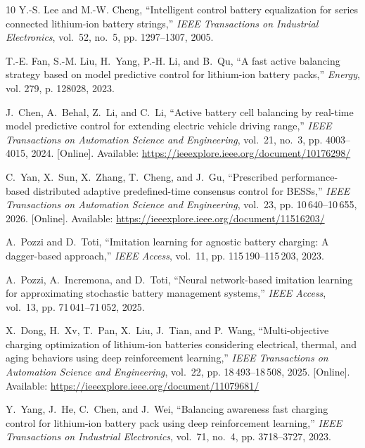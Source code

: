 \documentclass[10pt,journal,letterpaper]{IEEEtran}
\begin{document}
\begin{thebibliography}{10}
Y.-S. Lee and M.-W. Cheng, ``Intelligent control battery equalization for
  series connected lithium-ion battery strings,'' \emph{IEEE Transactions on
  Industrial Electronics}, vol.~52, no.~5, pp. 1297--1307, 2005.

T.-E. Fan, S.-M. Liu, H.~Yang, P.-H. Li, and B.~Qu, ``A fast active balancing
  strategy based on model predictive control for lithium-ion battery packs,''
  \emph{Energy}, vol. 279, p. 128028, 2023.

\BIBentryALTinterwordspacing
J.~Chen, A.~Behal, Z.~Li, and C.~Li, ``Active battery cell balancing by
  real-time model predictive control for extending electric vehicle driving
  range,'' \emph{IEEE Transactions on Automation Science and Engineering},
  vol.~21, no.~3, pp. 4003--4015, 2024. [Online]. Available:
  \url{https://ieeexplore.ieee.org/document/10176298/}
\BIBentrySTDinterwordspacing

\BIBentryALTinterwordspacing
C.~Yan, X.~Sun, X.~Zhang, T.~Cheng, and J.~Gu, ``Prescribed performance-based
  distributed adaptive predefined-time consensus control for {BESSs},''
  \emph{IEEE Transactions on Automation Science and Engineering}, vol.~23, pp.
  10\,640--10\,655, 2026. [Online]. Available:
  \url{https://ieeexplore.ieee.org/document/11516203/}
\BIBentrySTDinterwordspacing

A.~Pozzi and D.~Toti, ``Imitation learning for agnostic battery charging: A
  dagger-based approach,'' \emph{IEEE Access}, vol.~11, pp. 115\,190--115\,203,
  2023.

A.~Pozzi, A.~Incremona, and D.~Toti, ``Neural network-based imitation learning
  for approximating stochastic battery management systems,'' \emph{IEEE
  Access}, vol.~13, pp. 71\,041--71\,052, 2025.

\BIBentryALTinterwordspacing
X.~Dong, H.~Xv, T.~Pan, X.~Liu, J.~Tian, and P.~Wang, ``Multi-objective
  charging optimization of lithium-ion batteries considering electrical,
  thermal, and aging behaviors using deep reinforcement learning,'' \emph{IEEE
  Transactions on Automation Science and Engineering}, vol.~22, pp.
  18\,493--18\,508, 2025. [Online]. Available:
  \url{https://ieeexplore.ieee.org/document/11079681/}
\BIBentrySTDinterwordspacing

Y.~Yang, J.~He, C.~Chen, and J.~Wei, ``Balancing awareness fast charging
  control for lithium-ion battery pack using deep reinforcement learning,''
  \emph{IEEE Transactions on Industrial Electronics}, vol.~71, no.~4, pp.
  3718--3727, 2023.


\end{thebibliography}
\end{document}
